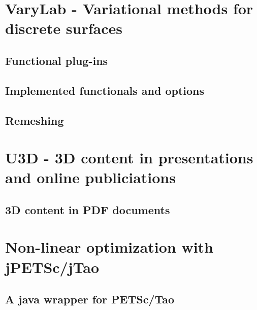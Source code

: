\section{{\sc VaryLab} - Variational methods for discrete surfaces}
\label{sec:varylab}
\subsection{Functional plug-ins}
\subsection{Implemented functionals and options}
\subsection{Remeshing}

\section{U3D - 3D content in presentations and online publiciations}
\label{sec:u3d}
\subsection{3D content in PDF documents}

\section{Non-linear optimization with jPETSc/jTao}
\label{sec:jpetsctao}
\subsection{A java wrapper for PETSc/Tao}

